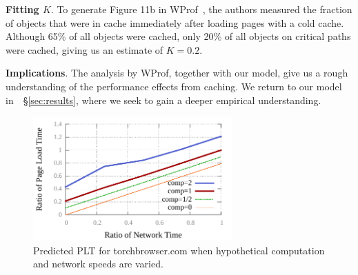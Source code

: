 %

{\bf Fitting $K$}. To generate Figure 11b in
WProf~\cite{wang2013demystifying}, the authors measured
the fraction of objects that were in cache
immediately after loading pages with a cold cache.
Although 65\% of all objects were cached, only 20\%
of all objects on critical paths were cached, giving us an estimate of
$K=0.2$.



{\bf Implications}. The analysis by WProf, together with our model, give us a
rough understanding of the performance effects from caching. We return to
our model in~~\S\ref{sec:results}, where we seek to gain a deeper empirical understanding.
\begin{figure}[t]
    \includegraphics[width=3in]{../graphs/whatif/ilivid2.pdf}
    \caption[]{\label{fig:whatif}Predicted PLT for torchbrowser.com
    when hypothetical computation and network speeds are varied.}
\end{figure}

